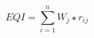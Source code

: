 \documentclass{senior-design}
\begin{document}
\maketitlepage

\begin{equation}
    EQI = \sum_{i=1}^{n}W_j\star r_{ij}
\end{equation}
\end{document}
